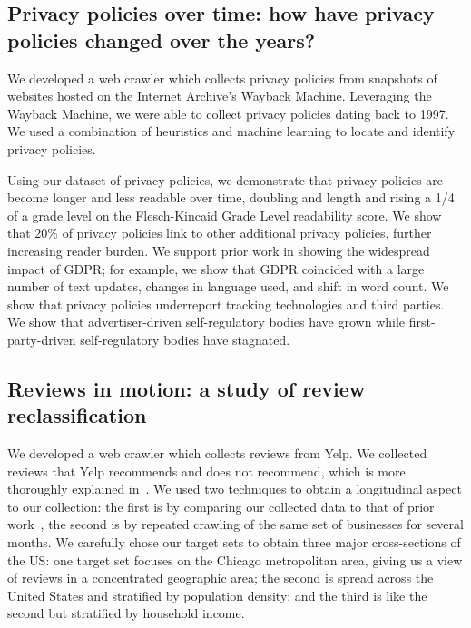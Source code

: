 \subsection{Privacy policies over time: how have privacy policies changed over the years?} \label{sec:intro:privacypolicies}
We developed a web crawler which collects privacy policies from snapshots of websites hosted on the Internet Archive's Wayback Machine. Leveraging the Wayback Machine, we were able to collect privacy policies dating back to 1997. We used a combination of heuristics and machine learning to locate and identify privacy policies. 

Using our dataset of privacy policies, we demonstrate that privacy policies are become longer and less readable over time, doubling and length and rising a 1/4 of a grade level on the Flesch-Kincaid Grade Level readability score. We show that 20\% of privacy policies link to other additional privacy policies, further increasing reader burden. We support prior work in showing the widespread impact of GDPR; for example, we show that GDPR coincided with a large number of text updates, changes in language used, and shift in word count. We show that privacy policies underreport tracking technologies and third parties.  We show that advertiser-driven self-regulatory bodies have grown while first-party-driven self-regulatory bodies have stagnated. 



\subsection{Reviews in motion: a study of review reclassification} \label{sec:intro:reviews}
We developed a web crawler which collects reviews from Yelp. We collected reviews that Yelp recommends and does not recommend, which is more thoroughly explained in~\cite{yelp2010recommendation}. We used two techniques to obtain a longitudinal aspect to our collection: the first is by comparing our collected data to that of prior work~\cite{mukherjee2013yelp}, the second is by repeated crawling of the same set of businesses for several months. We carefully chose our target sets to obtain three major cross-sections of the US: one target set focuses on the Chicago metropolitan area, giving us a view of reviews in a concentrated geographic area; the second is spread across the United States and stratified by population density; and the third is like the second but stratified by household income.

